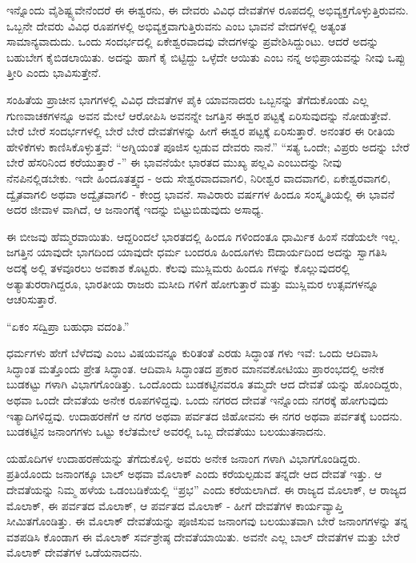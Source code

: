 ಇನ್ನೊಂದು ವೈಶಿಷ್ಟ್ಯವೇನೆಂದರೆ ಈ ಈಶ್ವರನು, ಈ ದೇವರು  ವಿವಿಧ ದೇವತೆಗಳ ರೂಪದಲ್ಲಿ ಅಭಿವ್ಯಕ್ತಗೊಳ್ಳುತ್ತಿರುವನು. ಒಬ್ಬನೇ ದೇವರು ವಿವಿಧ ರೂಪಗಳಲ್ಲಿ ಅಭಿವ್ಯಕ್ತವಾಗುತ್ತಿರುವನು ಎಂಬ ಭಾವನೆ ವೇದಗಳಲ್ಲಿ ಅತ್ಯಂತ ಸಾಮಾನ್ಯವಾದುದು. ಒಂದು ಸಂದರ್ಭದಲ್ಲಿ ಏಕೇಶ್ವರವಾದವು ವೇದಗಳನ್ನು ಪ್ರವೇಶಿಸಿದ್ದುಂಟು. ಆದರೆ ಅದನ್ನು ಬಹುಬೇಗ ಕೈಬಿಡಲಾಯಿತು. ಅದನ್ನು ಹಾಗೆ ಕೈ ಬಿಟ್ಟಿದ್ದು ಒಳ್ಳೆದೇ ಆಯಿತು ಎಂಬ ನನ್ನ ಅಭಿಪ್ರಾಯವನ್ನು ನೀವು ಒಪ್ಪು ತ್ತೀರಿ ಎಂದು ಭಾವಿಸುತ್ತೇನೆ.

ಸಂಹಿತೆಯ ಪ್ರಾಚೀನ ಭಾಗಗಳಲ್ಲಿ ವಿವಿಧ ದೇವತೆಗಳ ಪೈಕಿ ಯಾವನಾದರು ಒಬ್ಬನನ್ನು ತೆಗೆದುಕೊಂಡು ಎಲ್ಲ ಗುಣವಾಚಕಗಳನ್ನೂ ಅವನ ಮೇಲೆ ಆರೋಪಿಸಿ ಅವನನ್ನೇ ಜಗತ್ತಿನ ಈಶ್ವರ ಪಟ್ಟಕ್ಕೆ ಏರಿಸುವುದನ್ನು ನೋಡುತ್ತೇವೆ. ಬೇರೆ ಬೇರೆ ಸಂದರ್ಭಗಳಲ್ಲಿ ಬೇರೆ ಬೇರೆ ದೇವತೆಗಳನ್ನು ಹೀಗೆ ಈಶ್ವರ ಪಟ್ಟಕ್ಕೆ ಏರಿಸುತ್ತಾರೆ. ಅನಂತರ ಈ ರೀತಿಯ ಹೇಳಿಕೆಗಳು ಕಾಣಿಸಿಕೊಳ್ಳುತ್ತವೆ: “ಅಗ್ನಿಯಂತೆ ಪೂಜಿಸ ಲ್ಪಡುವ ದೇವರು ನಾನೆ.” “ಸತ್ಯ ಒಂದೇ; ವಿಪ್ರರು ಅದನ್ನು ಬೇರೆ ಬೇರೆ ಹೆಸರಿನಿಂದ ಕರೆಯುತ್ತಾರೆ -” ಈ ಭಾವನೆಯೇ ಭಾರತದ ಮುಖ್ಯ ಪಲ್ಲವಿ ಎಂಬುದನ್ನು ನೀವು ನೆನಪಿನಲ್ಲಿಡಬೇಕು. ಇದೇ ಹಿಂದೂತತ್ತ್ವದ - ಅದು ಸೇಶ್ವರವಾದವಾಗಲಿ, ನಿರೀಶ್ವರ ವಾದವಾಗಲಿ, ಏಕೇಶ್ವರವಾಗಲಿ, ದ್ವೈತವಾಗಲಿ ಅಥವಾ ಅದ್ವೈತವಾಗಲಿ - ಕೇಂದ್ರ ಭಾವನೆ. ಸಾವಿರಾರು ವರ್ಷಗಳ ಹಿಂದೂ ಸಂಸ್ಕೃತಿಯಲ್ಲಿ ಈ ಭಾವನೆ ಅದರ ಜೀವಾಳ ವಾಗಿದೆ, ಆ ಜನಾಂಗಕ್ಕೆ ಇದನ್ನು ಬಿಟ್ಟುಬಿಡುವುದು ಅಸಾಧ್ಯ.

ಈ ಬೀಜವು ಹೆಮ್ಮರವಾಯಿತು. ಆದ್ದರಿಂದಲೆ ಭಾರತದಲ್ಲಿ ಹಿಂದೂ ಗಳಿಂದಂತೂ ಧಾರ್ಮಿಕ ಹಿಂಸೆ ನಡೆಯಲೇ ಇಲ್ಲ. ಜಗತ್ತಿನ ಯಾವುದೇ ಭಾಗದಿಂದ ಯಾವುದೇ ಧರ್ಮ ಬಂದರೂ ಹಿಂದೂಗಳು ಔದಾರ್ಯದಿಂದ ಅದನ್ನು ಸ್ವಾಗತಿಸಿ ಅದಕ್ಕೆ ಅಲ್ಲಿ ತಳವೂರಲು ಅವಕಾಶ ಕೊಟ್ಟರು. ಕೆಲವು ಮುಸ್ಲಿಮರು ಹಿಂದೂ ಗಳನ್ನು ಕೊಲ್ಲುವುದರಲ್ಲಿ ಅತ್ಯಾತುರರಾಗಿದ್ದರೂ, ಭಾರತೀಯ ರಾಜರು ಮಸೀದಿ ಗಳಿಗೆ ಹೋಗುತ್ತಾರೆ ಮತ್ತು ಮುಸ್ಲಿಮರ ಉತ್ಸವಗಳನ್ನೂ ಆಚರಿಸುತ್ತಾರೆ.

“ಏಕಂ ಸದ್ವಿಪ್ರಾ ಬಹುಧಾ ವದಂತಿ.”

ಧರ್ಮಗಳು ಹೇಗೆ ಬೆಳೆದವು ಎಂಬ ವಿಷಯವನ್ನೂ ಕುರಿತಂತೆ ಎರಡು ಸಿದ್ಧಾಂತ ಗಳು ಇವೆ: ಒಂದು ಆದಿವಾಸಿ ಸಿದ್ಧಾಂತ ಮತ್ತೊಂದು ಪ್ರೇತ ಸಿದ್ಧಾಂತ. ಆದಿವಾಸಿ ಸಿದ್ಧಾಂತದ ಪ್ರಕಾರ ಮಾನವಕೋಟಿಯು ಪ್ರಾರಂಭದಲ್ಲಿ ಅನೇಕ ಬುಡಕಟ್ಟು ಗಳಾಗಿ ವಿಭಾಗಗೊಂಡಿತ್ತು. ಒಂದೊಂದು ಬುಡಕಟ್ಟಿನವರೂ ತಮ್ಮದೇ ಆದ ದೇವತೆ ಯನ್ನು ಹೊಂದಿದ್ದರು, ಅಥವಾ ಒಂದೇ ದೇವತೆಯ ಅನೇಕ ರೂಪಗಳಿದ್ದವು. ಒಂದು ನಗರದ ದೇವತೆ ಇನ್ನೊಂದು ನಗರಕ್ಕೆ ಹೋಗುವುದು ಇತ್ಯಾದಿಗಳಿದ್ದವು. ಉದಾಹರಣೆಗೆ ಆ ನಗರ ಅಥವಾ ಪರ್ವತದ ಜಿಹೋವನು ಈ ನಗರ ಅಥವಾ ಪರ್ವತಕ್ಕೆ ಬಂದನು. ಬುಡಕಟ್ಟಿನ ಜನಾಂಗಗಳು ಒಟ್ಟು ಕಲೆತಮೇಲೆ ಅವರಲ್ಲಿ ಒಬ್ಬ ದೇವತೆಯು ಬಲಯುತನಾದನು.

ಯಹೊದಿಗಳ ಉದಾಹರಣೆಯನ್ನು ತೆಗೆದುಕೊಳ್ಳಿ. ಅವರು ಅನೇಕ ಜನಾಂಗ ಗಳಾಗಿ ವಿಭಾಗಗೊಂಡಿದ್ದರು. ಪ್ರತಿಯೊಂದು ಜನಾಂಗಕ್ಕೂ ಬಾಲ್ ಅಥವಾ ಮೊಲಾಕ್ ಎಂದು ಕರೆಯಲ್ಪಡುವ ತನ್ನದೇ ಆದ ದೇವತೆ ಇತ್ತು. ಆ ದೇವತೆಯನ್ನು ನಿಮ್ಮ ಹಳೆಯ ಒಡಂಬಡಿಕೆಯಲ್ಲಿ “ಪ್ರಭ” ಎಂದು ಕರೆಯಲಾಗಿದೆ. ಈ ರಾಜ್ಯದ ಮೊಲಾಕ್, ಆ ರಾಜ್ಯದ ಮೊಲಾಕ್, ಈ ಪರ್ವತದ ಮೊಲಾಕ್, ಆ ಪರ್ವತದ ಮೊಲಾಕ್ - ಹೀಗೆ ದೇವತೆಗಳ ಕಾರ್ಯವ್ಯಾಪ್ತಿ ಸೀಮಿತಗೊಂಡಿತ್ತು. ಈ ಮೊಲಾಕ್ ದೇವತೆಯನ್ನು ಪೂಜಿಸುವ ಜನಾಂಗವು ಬಲಯುತವಾಗಿ ಬೇರೆ ಜನಾಂಗಗಳನ್ನು ತನ್ನ ವಶಪಡಿಸಿ ಕೊಂಡಾಗ ಈ ಮೊಲಾಕ್ ಸರ್ವಶ್ರೇಷ್ಠ ದೇವತೆಯಾಯಿತು. ಅವನೇ ಎಲ್ಲ ಬಾಲ್ ದೇವತೆಗಳ ಮತ್ತು ಬೇರೆ ಮೊಲಾಕ್ ದೇವತೆಗಳ ಒಡೆಯನಾದನು.

